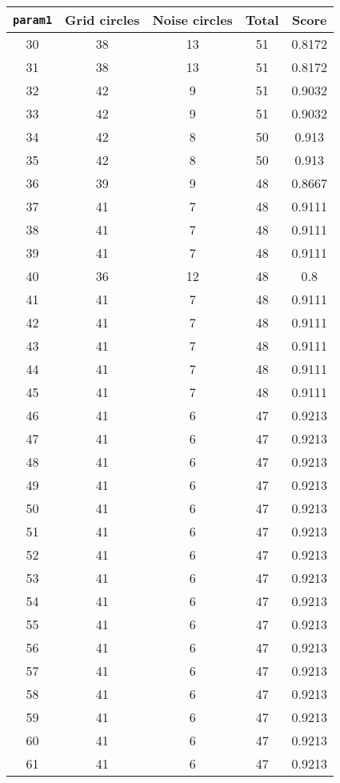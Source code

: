 \documentclass[letterpaper, 12pt]{article}
\begin{document}
\begin{longtable}{|c|c|c|c|c|}
\hline
\textbf{\texttt{param1}} & \textbf{Grid circles} & \textbf{Noise circles} & \textbf{Total} & \textbf{Score} \\
\hline
30 & 38 & 13 & 51 & 0.8172 \\
\hline
31 & 38 & 13 & 51 & 0.8172 \\
\hline
32 & 42 & 9 & 51 & 0.9032 \\
\hline
33 & 42 & 9 & 51 & 0.9032 \\
\hline
34 & 42 & 8 & 50 & 0.913 \\
\hline
35 & 42 & 8 & 50 & 0.913 \\
\hline
36 & 39 & 9 & 48 & 0.8667 \\
\hline
37 & 41 & 7 & 48 & 0.9111 \\
\hline
38 & 41 & 7 & 48 & 0.9111 \\
\hline
39 & 41 & 7 & 48 & 0.9111 \\
\hline
40 & 36 & 12 & 48 & 0.8 \\
\hline
41 & 41 & 7 & 48 & 0.9111 \\
\hline
42 & 41 & 7 & 48 & 0.9111 \\
\hline
43 & 41 & 7 & 48 & 0.9111 \\
\hline
44 & 41 & 7 & 48 & 0.9111 \\
\hline
45 & 41 & 7 & 48 & 0.9111 \\
\hline
46 & 41 & 6 & 47 & 0.9213 \\
\hline
47 & 41 & 6 & 47 & 0.9213 \\
\hline
48 & 41 & 6 & 47 & 0.9213 \\
\hline
49 & 41 & 6 & 47 & 0.9213 \\
\hline
50 & 41 & 6 & 47 & 0.9213 \\
\hline
51 & 41 & 6 & 47 & 0.9213 \\
\hline
52 & 41 & 6 & 47 & 0.9213 \\
\hline
53 & 41 & 6 & 47 & 0.9213 \\
\hline
54 & 41 & 6 & 47 & 0.9213 \\
\hline
55 & 41 & 6 & 47 & 0.9213 \\
\hline
56 & 41 & 6 & 47 & 0.9213 \\
\hline
57 & 41 & 6 & 47 & 0.9213 \\
\hline
58 & 41 & 6 & 47 & 0.9213 \\
\hline
59 & 41 & 6 & 47 & 0.9213 \\
\hline
60 & 41 & 6 & 47 & 0.9213 \\
\hline
61 & 41 & 6 & 47 & 0.9213 \\

\end{longtable}
\end{document}
